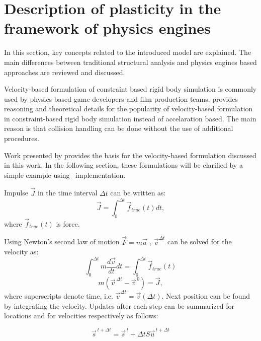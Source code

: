 \section{Description of plasticity in the framework of physics engines}

In this section, key concepts related to the introduced model are explained. The main differences between 
traditional structural analysis and physics engines based approaches are reviewed and discussed.

Velocity-based formulation of constraint based rigid body simulation 
is  commonly used by physics based game
developers and film production teams.
\cite{erleben.thesis} 
provides reasoning and theoretical details for the popularity of 
velocity-based formulation in constraint-based rigid body simulation instead of accelaration based. 
The main reason is that collision handling can be done without the use of additional procedures.

Work presented by  
\cite{erleben.thesis} provides the basis for the velocity-based formulation discussed in this work.
In the following section, these formulations will be clarified by a simple example using \cbullet\ implementation.

Impulse $\vec{J}$
in the time interval $\Delta t $ can be written as:
\begin{equation} \label{eq:impulseIntegral}
\vec{J} = \int_{0}^{\Delta t} \vec{f}_{true}(t) dt,
\end{equation}
where $\vec{f}_{true}(t)$ is force.

Using Newton's second law of motion $\vec{F}=m\vec{a}$ ,
$\vec{v}^{\Delta t}$ can be solved for the velocity as:
\begin{equation} \label{eq:impulseIntegraWithNewton}
\int_{0}^{\Delta t} m \frac{d\vec{v}}{dt}dt= \int_{0}^{\Delta t} \vec{f}_{true}(t)
\end{equation}
\begin{equation} \label{eq:impulse}
m(\vec{v}^{\, \Delta t} - \vec{v}^{\, 0})=\vec{J},
\end{equation}
where superscripts denote time, i.e. ${\vec{v}}^{\Delta t}=\vec{v}(\Delta t)$.
Next position can be found
by integrating the velocity.
Updates after each step can be summarized  for locations and  
for velocities respectively as follows:

\begin{equation} \label{eq:eomL} %
\vec{s}^{\, t+\Delta t} = \vec{s}^{\, t}+\Delta t S \vec{u}^{\, t+\Delta t}
\end{equation}

